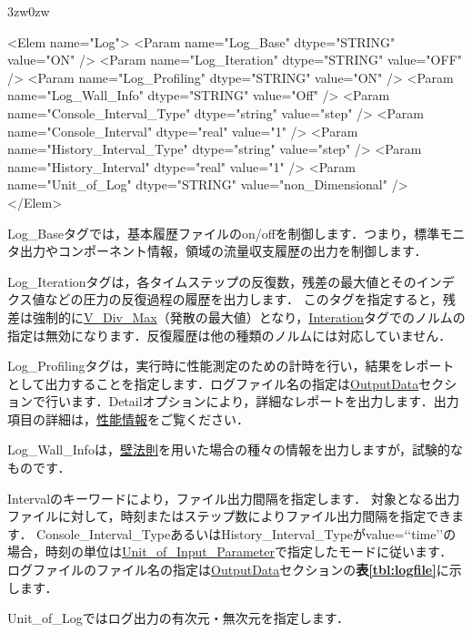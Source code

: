 \begin{indentation}{3zw}{0zw}

{\small
\begin{program}
<Elem name="Log">
  <Param name="Log_Base"              dtype="STRING" value="ON" />
  <Param name="Log_Iteration"         dtype="STRING" value="OFF" />
  <Param name="Log_Profiling"         dtype="STRING" value="ON" />
  <Param name="Log_Wall_Info"         dtype="STRING" value="Off" />
  <Param name="Console_Interval_Type" dtype="string" value="step" />
  <Param name="Console_Interval"      dtype="real"   value="1" />
  <Param name="History_Interval_Type" dtype="string" value="step" />
  <Param name="History_Interval"      dtype="real"   value="1" />
  <Param name="Unit_of_Log"           dtype="STRING" value="non_Dimensional" />
</Elem>
\end{program}
}

Log\_Baseタグでは，基本履歴ファイルのon/offを制御します．つまり，標準モニタ出力やコンポーネント情報，領域の流量収支履歴の出力を制御します．

Log\_Iterationタグは，各タイムステップの反復数，残差の最大値とそのインデクス値などの圧力の反復過程の履歴を出力します．
このタグを指定すると，残差は強制的に\hyperlink{tgt:iteration}{V\_Div\_Max}（発散の最大値）となり，\hyperlink{tgt:iteration}{Interation}タグでのノルムの指定は無効になります．反復履歴は他の種類のノルムには対応していません．

Log\_Profilingタグは，実行時に性能測定のための計時を行い，結果をレポートとして出力することを指定します．ログファイル名の指定は\hyperlink{tgt:output_data}{OutputData}セクションで行います．Detailオプションにより，詳細なレポートを出力します．出力項目の詳細は，\hyperlink{tgt:profile}{性能情報}をご覧ください．

Log\_Wall\_Infoは，\hyperlink{tgt:treatment_of_wall}{壁法則}を用いた場合の種々の情報を出力しますが，試験的なものです．

Intervalのキーワードにより，ファイル出力間隔を指定します．
対象となる出力ファイルに対して，時刻またはステップ数によりファイル出力間隔を指定できます．
Console\_Interval\_TypeあるいはHistory\_Interval\_Typeがvalue=\lq\lq time\rq\rq の場合，時刻の単位は\hyperlink{tgt:unit}{Unit\_of\_Input\_Parameter}で指定したモードに従います．
ログファイルのファイル名の指定は\hyperlink{tgt:output_data}{OutputData}セクションの\textbf{表\ref{tbl:logfile}}に示します．

Unit\_of\_Logではログ出力の有次元・無次元を指定します．


\end{indentation}
